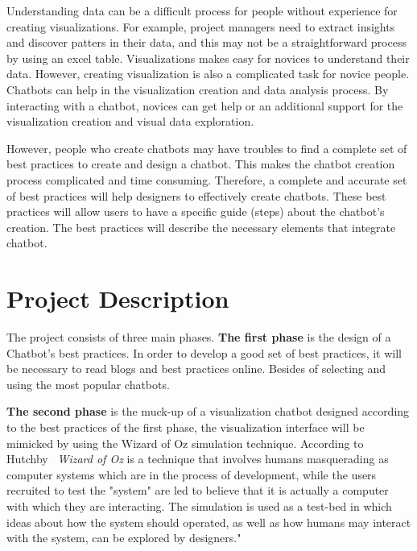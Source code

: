 \documentclass[a4paper,10pt]{article}
\begin{document}

Understanding data can be a difficult process for people without experience for creating visualizations. For example, project managers need to extract insights and discover patters in their data, and this may not be a straightforward process by using an excel table. Visualizations makes easy for novices to understand their data. However, creating visualization is also a complicated task for novice people. Chatbots can help in the visualization creation and data analysis process. By interacting with a chatbot, novices can get help or an additional support for the visualization creation and visual data exploration.

However, people who create chatbots may have troubles to find a complete set of best practices to create and design a chatbot. This makes the chatbot creation process complicated and time consuming. Therefore, a complete and accurate set of best practices will help designers to effectively create chatbots. These best practices will allow users to have a specific guide (steps) about the chatbot's creation. The best practices will describe the necessary elements that integrate chatbot.     


\section*{Project Description}

The project consists of three main phases. \textbf{The first phase} is the design of a Chatbot's best practices. In order to develop a good set of best practices, it will be necessary to read blogs and best practices online. Besides of selecting and using the most popular chatbots. 

\textbf{The second phase} is the muck-up of a visualization chatbot designed according to the best practices of the first phase, the visualization interface will be mimicked by using the Wizard of Oz simulation technique. According to Hutchby~\cite{Hutchby2001} \textit{Wizard of Oz} is a technique that involves humans masquerading as computer systems which are in the process of development, while the users recruited to test the "system" are led to believe that it is actually a computer with which they are interacting.  The simulation is used as a test-bed in which ideas about how the system should operated, as well as how humans may interact with the system, can be explored by designers." 
\end{document}
